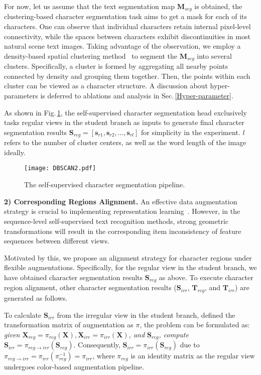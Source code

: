 \documentclass[10pt,twocolumn,letterpaper]{article}
\begin{document}
For now, let us assume that the text segmentation map $\mathbf{M}_{seg}$ is obtained, the clustering-based character segmentation task aims to get a mask for each of its characters.
One can observe that individual characters retain internal pixel-level connectivity, while the spaces between characters exhibit discontinuities in most natural scene text images. Taking advantage of the observation, we employ a density-based spatial clustering method~\cite{DBSCAN} to
segment the $\mathbf{M}_{seg}$ into several clusters. Specifically, a cluster is formed by aggregating all nearby points connected by density and grouping them together. 
Then, the points within each cluster can be viewed as a character structure. A discussion about hyper-parameters is deferred to ablations and analysis in Sec.\,\ref{Hyper-parameter}.


As shown in Fig.\,\ref{Figs.DBSCAN}, the self-supervised character segmentation head exclusively tasks regular views in the student branch as inputs to generate final character segmentation results $\mathbf{S}_{reg} = [\mathbf{s}_{r1}, \mathbf{s}_{r2}, ..., \mathbf{s}_{rl}]$ for simplicity in the experiment. $l$ refers to the number of cluster centers, as well as the word length of the image ideally.

\begin{figure}[t]
  \centering
  \graphicspath{{./graph/}}
  \texttt{[image: DBSCAN2.pdf]}
  \caption{The self-supervised character segmentation pipeline. 
  }
  \label{Figs.DBSCAN}
  \vspace{-1.0em}
\end{figure}
\noindent \textbf{2) Corresponding Regions Alignment.}
An effective data augmentation strategy is crucial to implementing representation learning~\cite{SimCLR,asano2019critical,henaff2020data}. However, in the sequence-level self-supervised text recognition methods, strong geometric transformations will result in the corresponding item inconsistency of feature sequences between different views. 

Motivated by this, we propose an alignment strategy for character regions under flexible augmentations. Specifically,  for the regular view in the student branch, we have obtained character segmentation results $\mathbf{S}_{reg}$ as above. To execute character region alignment, other character segmentation results ($\mathbf{S}_{irr}$, $\mathbf{T}_{reg}$, and $\mathbf{T}_{irr}$) are generated as follows.

To calculate $\mathbf{S}_{irr}$ from the irregular view in the student branch, defined the transformation matrix of augmentation as $\pi$, the problem can be formulated as: \emph{given $\mathbf{X}_{reg} = \pi_{reg}(\mathbf{X}), \mathbf{X}_{irr} = \pi_{irr}(\mathbf{X})$, and $\mathbf{S}_{reg}$, compute $\mathbf{S}_{irr} = \pi_{reg \to irr}(\mathbf{S}_{reg})$}. Consequently, $\mathbf{S}_{irr} = \pi_{irr}(\mathbf{S}_{reg})$ due to $\pi_{reg \to irr} = \pi_{irr}(\pi_{reg}^{-1}) = \pi_{irr}$, where $\pi_{reg}$ is an identity matrix as the regular view undergoes color-based augmentation pipeline. 
\end{document}
